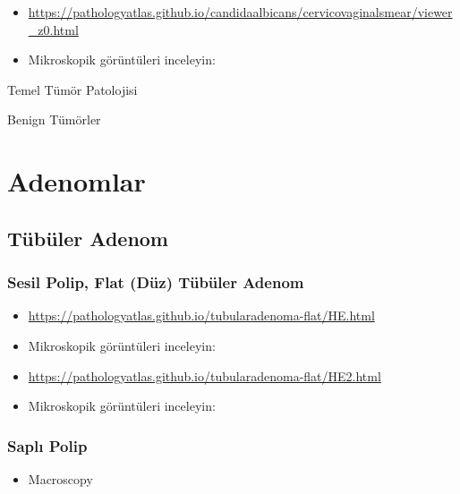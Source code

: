 \documentclass[
  letterpaper,
  DIV=11,
  numbers=noendperiod]{scrreprt}
\providecommand{\tightlist}{%
  \setlength{\itemsep}{0pt}\setlength{\parskip}{0pt}}
\begin{document}
\begin{itemize}
\item
  \url{https://pathologyatlas.github.io/candidaalbicans/cervicovaginalsmear/viewer_z0.html}
\item
  Mikroskopik görüntüleri inceleyin:
\end{itemize}

Temel Tümör Patolojisi

Benign Tümörler

\hypertarget{adenomlar}{%
\chapter{Adenomlar}\label{adenomlar}}

\hypertarget{tuxfcbuxfcler-adenom}{%
\section{Tübüler Adenom}\label{tuxfcbuxfcler-adenom}}

\hypertarget{sesil-polip-flat-duxfcz-tuxfcbuxfcler-adenom}{%
\subsection{Sesil Polip, Flat (Düz) Tübüler
Adenom}\label{sesil-polip-flat-duxfcz-tuxfcbuxfcler-adenom}}

\begin{itemize}
\item
  \url{https://pathologyatlas.github.io/tubularadenoma-flat/HE.html}
\item
  Mikroskopik görüntüleri inceleyin:
\end{itemize}

\begin{itemize}
\item
  \url{https://pathologyatlas.github.io/tubularadenoma-flat/HE2.html}
\item
  Mikroskopik görüntüleri inceleyin:
\end{itemize}

\hypertarget{saplux131-polip}{%
\subsection{Saplı Polip}\label{saplux131-polip}}

\begin{itemize}
\tightlist
\item
  Macroscopy
\end{itemize}
\end{document}
